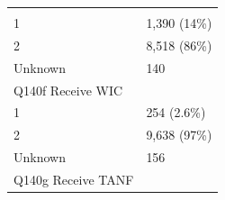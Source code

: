\documentclass[]{article}
\begin{document}
\begin{longtable}[]{@{}ll@{}}
\begin{minipage}[t]{0.23\columnwidth}
\strut
\end{minipage}\tabularnewline
\begin{minipage}[t]{0.71\columnwidth}\raggedright
1\strut
\end{minipage} & \begin{minipage}[t]{0.23\columnwidth}\raggedright
1,390 (14\%)\strut
\end{minipage}\tabularnewline
\begin{minipage}[t]{0.71\columnwidth}\raggedright
2\strut
\end{minipage} & \begin{minipage}[t]{0.23\columnwidth}\raggedright
8,518 (86\%)\strut
\end{minipage}\tabularnewline
\begin{minipage}[t]{0.71\columnwidth}\raggedright
Unknown\strut
\end{minipage} & \begin{minipage}[t]{0.23\columnwidth}\raggedright
140\strut
\end{minipage}\tabularnewline
\begin{minipage}[t]{0.71\columnwidth}\raggedright
Q140f Receive WIC\strut
\end{minipage} & \begin{minipage}[t]{0.23\columnwidth}\raggedright
\strut
\end{minipage}\tabularnewline
\begin{minipage}[t]{0.71\columnwidth}\raggedright
1\strut
\end{minipage} & \begin{minipage}[t]{0.23\columnwidth}\raggedright
254 (2.6\%)\strut
\end{minipage}\tabularnewline
\begin{minipage}[t]{0.71\columnwidth}\raggedright
2\strut
\end{minipage} & \begin{minipage}[t]{0.23\columnwidth}\raggedright
9,638 (97\%)\strut
\end{minipage}\tabularnewline
\begin{minipage}[t]{0.71\columnwidth}\raggedright
Unknown\strut
\end{minipage} & \begin{minipage}[t]{0.23\columnwidth}\raggedright
156\strut
\end{minipage}\tabularnewline
\begin{minipage}[t]{0.71\columnwidth}\raggedright
Q140g Receive TANF\strut
\end{minipage} & \begin{minipage}[t]{0.23\columnwidth}\raggedright

\end{minipage}
\end{longtable}
\end{document}
